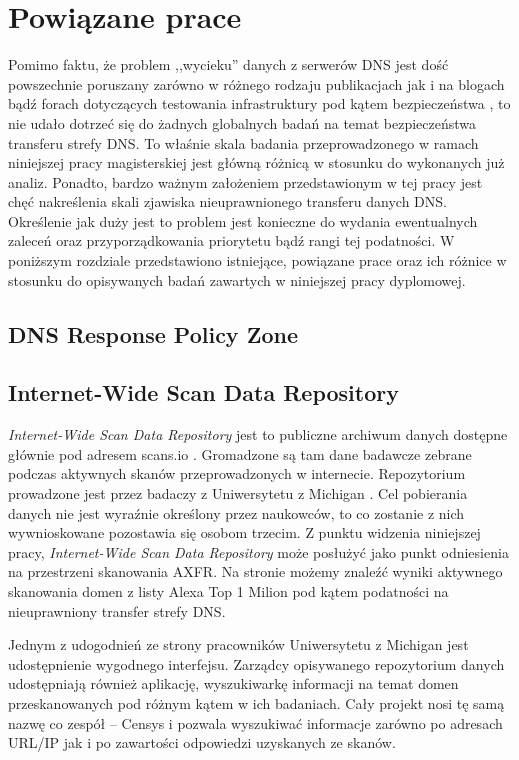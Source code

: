\chapter{Powiązane prace}
Pomimo faktu, że problem ,,wycieku'' danych z serwerów DNS jest dość powszechnie poruszany zarówno w różnego rodzaju publikacjach \cite{uscert}
jak i na blogach bądź forach dotyczących testowania infrastruktury pod kątem bezpieczeństwa \cite{stackexchange, zonetransfer}, to nie udało dotrzeć
się do żadnych globalnych badań na temat bezpieczeństwa transferu strefy DNS. To właśnie skala badania przeprowadzonego w ramach
niniejszej pracy magisterskiej jest główną różnicą w stosunku do wykonanych już analiz. Ponadto, bardzo ważnym założeniem
przedstawionym w tej pracy jest chęć nakreślenia skali zjawiska nieuprawnionego transferu danych DNS. Określenie jak duży jest to
problem jest konieczne do wydania ewentualnych zaleceń oraz przyporządkowania priorytetu bądź rangi tej podatności. W poniższym
rozdziale przedstawiono istniejące, powiązane prace oraz ich różnice w stosunku do opisywanych badań zawartych w niniejszej pracy
dyplomowej.

\section{DNS Response Policy Zone}


\section{Internet-Wide Scan Data Repository}
\textit{Internet-Wide Scan Data Repository} jest to publiczne archiwum danych dostępne głównie pod adresem scans.io \cite{scans.io}.
Gromadzone są tam dane badawcze zebrane podczas aktywnych skanów przeprowadzonych w internecie. Repozytorium prowadzone jest przez
badaczy z Uniwersytetu z Michigan \cite{censys}. Cel pobierania danych nie jest wyraźnie określony przez naukowców, to co zostanie z
nich wywnioskowane pozostawia się osobom trzecim. Z punktu widzenia niniejszej pracy, \textit{Internet-Wide Scan Data Repository}
może posłużyć jako punkt odniesienia na przestrzeni skanowania AXFR. Na stronie możemy znaleźć wyniki aktywnego skanowania domen z
listy Alexa Top 1 Milion \cite{alexa} pod kątem podatności na nieuprawniony transfer strefy DNS.

Jednym z udogodnień ze strony pracowników Uniwersytetu z Michigan jest udostępnienie wygodnego interfejsu. Zarządcy
opisywanego repozytorium danych udostępniają również aplikację, wyszukiwarkę informacji na temat domen przeskanowanych pod różnym
kątem w ich badaniach. Cały projekt nosi tę samą nazwę co zespół -- Censys \cite{censys} i pozwala wyszukiwać informacje zarówno po
adresach URL/IP jak i po zawartości odpowiedzi uzyskanych ze skanów.


